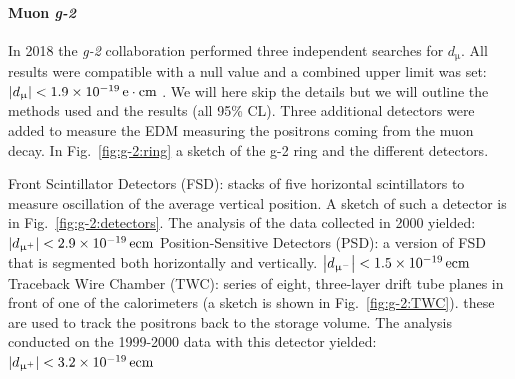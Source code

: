 \begin{refsection}
            \paragraph{Muon \textit{g-2}}
            In 2018 the \textit{g-2} collaboration performed three independent searches for $d_\upmu$.
            All results were compatible with a null value and a combined upper limit was set: $\abs{d_\upmu}<\SI{1.9e-19}{e\cdot cm}$ \cite{muEDM:direct}.  
            We will here skip the details but we will outline the methods used and the results (all 95\% CL).
            Three additional detectors were added to measure the EDM measuring the positrons coming from the muon decay.
            In Fig.~\ref{fig:g-2:ring} a sketch of the g-2 ring and the different detectors.
            \begin{outline}
                \1 Front Scintillator Detectors (FSD): stacks of five horizontal scintillators to measure oscillation of the average vertical position. A sketch of such a detector is in Fig.~\ref{fig:g-2:detectors}.
                The analysis of the data collected in 2000 yielded: $\abs{d_{\upmu^+}} < \SI{2.9e-19}{ecm}$
                \1 Position-Sensitive Detectors (PSD): a version of FSD that is segmented both horizontally and vertically.
                $\abs{d_{\upmu^-}} < \SI{1.5e-19}{ecm}$
                \1 Traceback Wire Chamber (TWC): series of eight, three-layer drift tube planes in front of one of the calorimeters (a sketch is shown in Fig.~\ref{fig:g-2:TWC}). these are used to track the positrons back to the storage volume.
                The analysis conducted on the 1999-2000 data with this detector yielded: $\abs{d_{\upmu^+}} < \SI{3.2e-19}{ecm}$
            \end{outline}


\end{refsection}
